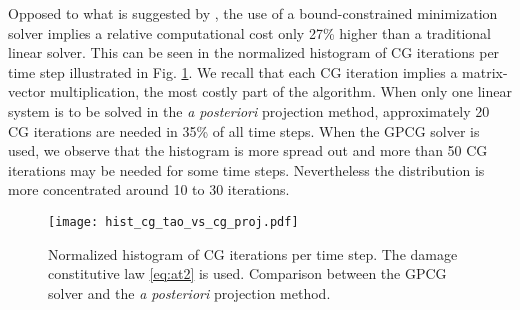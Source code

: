 Opposed to what is suggested by \cite{AmorMarigoMaurini:2009}, the use of a bound-constrained minimization solver implies a relative computational cost only 27\% higher than a traditional linear solver. This can be seen in the normalized histogram of CG iterations per time step illustrated in Fig. \ref{fig:histcg}. We recall that each CG iteration implies a matrix-vector multiplication, the most costly part of the algorithm. When only one linear system is to be solved in the \emph{a posteriori} projection method, approximately 20 CG iterations are needed in 35\% of all time steps. When the GPCG solver is used, we observe that the histogram is more spread out and more than 50 CG iterations may be needed for some time steps. Nevertheless the distribution is more concentrated around 10 to 30 iterations.
\begin{figure}[htbp]
\centering
\texttt{[image: hist\_cg\_tao\_vs\_cg\_proj.pdf]}
\caption{Normalized histogram of CG iterations per time step. The damage constitutive law \eqref{eq:at2} is used. Comparison between the GPCG solver and the \emph{a posteriori} projection method.} \label{fig:histcg}
\end{figure}

